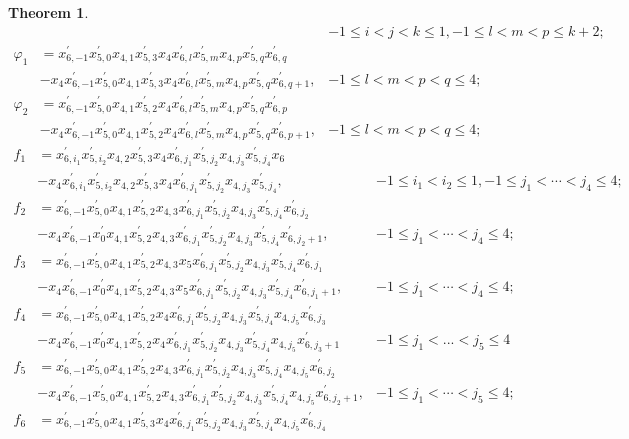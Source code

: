 \documentclass[UTF8]{amsart}
\newtheorem{theorem}[tpcl]{Theorem}
\theoremstyle{definition}
\theoremstyle{remark}
\numberwithin{equation}{section}
\begin{document}
\begin{theorem}
\begin{align*}
          &&-1\leq i<j<k\leq 1,-1\leq l<m<p\leq k+2;\\
\varphi_1&=x_{6,-1}^{'}x_{5,0}^{'}x_{4,1}x_{5,3}^{'}x_4x_{6,l}^{'}x_{5,m}^{'}x_{4,p}x_{5,q}^{'}x_{6,q}^{'} &\\
    &-x_4x_{6,-1}^{'}x_{5,0}^{'}x_{4,1}x_{5,3}^{'}x_4x_{6,l}^{'}x_{5,m}^{'}x_{4,p}x_{5,q}^{'}x_{6,q+1}^{'},&-1\leq  l<m<p<q\leq 4;\\
\varphi_2&=x_{6,-1}^{'}x_{5,0}^{'}x_{4,1}x_{5,2}^{'}x_4x_{6,l}^{'}x_{5,m}^{'}x_{4,p}x_{5,q}^{'}x_{6,p}^{'} &\\
    &-x_4x_{6,-1}^{'}x_{5,0}^{'}x_{4,1}x_{5,2}^{'}x_4x_{6,l}^{'}x_{5,m}^{'}x_{4,p}x_{5,q}^{'}x_{6,p+1}^{'},&-1\leq  l<m<p<q\leq 4;
\end{align*}
\begin{align*}
f_1&=x_{6,i_1}^{'}x_{5,i_2}^{'}x_{4,2}x_{5,3}^{'}x_4x_{6,j_1}^{'}x_{5,j_2}^{'}x_{4,j_3}x_{5,j_4}^{'}x_6&\\
    &-x_4x_{6,i_1}^{'}x_{5,i_2}^{'}x_{4,2}x_{5,3}^{'}x_4x_{6,j_1}^{'}x_{5,j_2}^{'}x_{4,j_3}x_{5,j_4}^{'},&-1\leq i_1<i_2\leq 1,-1\leq j_1<\cdots<j_4\leq 4;\\
f_2&=x_{6,-1}^{'}x_{5,0}^{'}x_{4,1}x_{5,2}^{'}x_{4,3}x_{6,j_1}^{'}x_{5,j_2}^{'}x_{4,j_3}x_{5,j_4}^{'}x_{6,j_2}^{'}&\\
    &-x_4x_{6,-1}^{'}x_{0}^{'}x_{4,1}x_{5,2}^{'}x_{4,3}x_{6,j_1}^{'}x_{5,j_2}^{'}x_{4,j_3}x_{5,j_4}^{'}x_{6,j_2+1}^{'},&  -1\leq j_1<\cdots<j_4\leq 4;\\
f_3&=x_{6,-1}^{'}x_{5,0}^{'}x_{4,1}x_{5,2}^{'}x_{4,3}x_5x_{6,j_1}^{'}x_{5,j_2}^{'}x_{4,j_3}x_{5,j_4}^{'}x_{6,j_1}^{'}&\\
    &-x_4x_{6,-1}^{'}x_{0}^{'}x_{4,1}x_{5,2}^{'}x_{4,3}x_5x_{6,j_1}^{'}x_{5,j_2}^{'}x_{4,j_3}x_{5,j_4}^{'}x_{6,j_1+1}^{'},&-1\leq   j_1<\cdots<j_4\leq 4;\\
f_4&=x_{6,-1}^{'}x_{5,0}^{'}x_{4,1}x_{5,2}^{'}x_{4}x_{6,j_1}^{'}x_{5,j_2}^{'}x_{4,j_3}x_{5,j_4}^{'}x_{4,j_5}x_{6,j_3}^{'}&\\
    &-x_4x_{6,-1}^{'}x_{0}^{'}x_{4,1}x_{5,2}^{'}x_{4}x_{6,j_1}^{'}x_{5,j_2}^{'}x_{4,j_3}x_{5,j_4}^{'}x_{4,j_5}x_{6,j_3+1}^{'}& -1\leq  j_1<...<j_5\leq 4\\
f_5&=x_{6,-1}^{'}x_{5,0}^{'}x_{4,1}x_{5,2}^{'}x_{4,3}x_{6,j_1}^{'}x_{5,j_2}^{'}x_{4,j_3}x_{5,j_4}^{'}x_{4,j_5}x_{6,j_2}^{'}&\\
    &-x_4x_{6,-1}^{'}x_{5,0}^{'}x_{4,1}x_{5,2}^{'}x_{4,3}x_{6,j_1}^{'}x_{5,j_2}^{'}x_{4,j_3}x_{5,j_4}^{'}x_{4,j_5}x_{6,j_2+1}^{'},& -1\leq  j_1<\cdots<j_5\leq 4;\\
f_6&=x_{6,-1}^{'}x_{5,0}^{'}x_{4,1}x_{5,3}^{'}x_{4}x_{6,j_1}^{'}x_{5,j_2}^{'}x_{4,j_3}x_{5,j_4}^{'}x_{4,j_5}x_{6,j_4}^{'}&\\

\end{align*}
\end{theorem}
\end{document}
